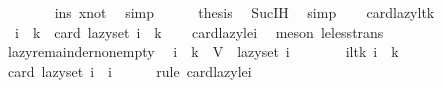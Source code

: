 \begin{isabellebody}
\ \ \ \ \ \ \isamarkupfalse%
\ ins\ xnot\ \isamarkupfalse%
\ simp\isanewline
\ \ \ \ \isamarkupfalse%
\ {\isacharquery}{\kern0pt}thesis\ \isamarkupfalse%
\ Suc{\isachardot}{\kern0pt}IH\ \isamarkupfalse%
\ simp\isanewline
\ \ \isamarkupfalse%
\isanewline
{}\isamarkupfalse%
%
\endisatagproof
{\isafoldproof}%
%
\isadelimproof
\isanewline
%
\endisadelimproof
\isanewline
{}\isamarkupfalse%
\ card{\isacharunderscore}{\kern0pt}lazy{\isacharunderscore}{\kern0pt}lt{\isacharunderscore}{\kern0pt}k{\isacharcolon}{\kern0pt}\isanewline
\ \ {\isachardoublequoteopen}i\ {\isacharless}{\kern0pt}\ k\ {\isasymLongrightarrow}\ card\ {\isacharparenleft}{\kern0pt}lazy{\isacharunderscore}{\kern0pt}set\ i{\isacharparenright}{\kern0pt}\ {\isacharless}{\kern0pt}\ k{\isachardoublequoteclose}\isanewline
%
\isadelimproof
\ \ %
\endisadelimproof
%
\isatagproof
{}\isamarkupfalse%
\ card{\isacharunderscore}{\kern0pt}lazy{\isacharunderscore}{\kern0pt}le{\isacharunderscore}{\kern0pt}i\ \isamarkupfalse%
\ {\isacharparenleft}{\kern0pt}meson\ le{\isacharunderscore}{\kern0pt}less{\isacharunderscore}{\kern0pt}trans{\isacharparenright}{\kern0pt}%
\endisatagproof
{\isafoldproof}%
%
\isadelimproof
\isanewline
%
\endisadelimproof
\isanewline
{}\isamarkupfalse%
\ lazy{\isacharunderscore}{\kern0pt}remainder{\isacharunderscore}{\kern0pt}nonempty{\isacharcolon}{\kern0pt}\isanewline
\ \ {\isachardoublequoteopen}i\ {\isacharless}{\kern0pt}\ k\ {\isasymLongrightarrow}\ V\ {\isacharminus}{\kern0pt}\ lazy{\isacharunderscore}{\kern0pt}set\ i\ {\isasymnoteq}\ {\isacharbraceleft}{\kern0pt}{\isacharbraceright}{\kern0pt}{\isachardoublequoteclose}\isanewline
%
\isadelimproof
%
\endisadelimproof
%
\isatagproof
{}\isamarkupfalse%
\ {\isacharminus}{\kern0pt}\isanewline
\ \ \isamarkupfalse%
\ i{\isacharunderscore}{\kern0pt}lt{\isacharunderscore}{\kern0pt}k{\isacharcolon}{\kern0pt}\ {\isachardoublequoteopen}i\ {\isacharless}{\kern0pt}\ k{\isachardoublequoteclose}\isanewline
\isanewline
\ \ \isamarkupfalse%
\ {\isachardoublequoteopen}card\ {\isacharparenleft}{\kern0pt}lazy{\isacharunderscore}{\kern0pt}set\ i{\isacharparenright}{\kern0pt}\ {\isasymle}\ i{\isachardoublequoteclose}\isanewline
\ \ \ \ \isamarkupfalse%
\ {\isacharparenleft}{\kern0pt}rule\ card{\isacharunderscore}{\kern0pt}lazy{\isacharunderscore}{\kern0pt}le{\isacharunderscore}{\kern0pt}i{\isacharparenright}{\kern0pt}\isanewline

\end{isabellebody}
